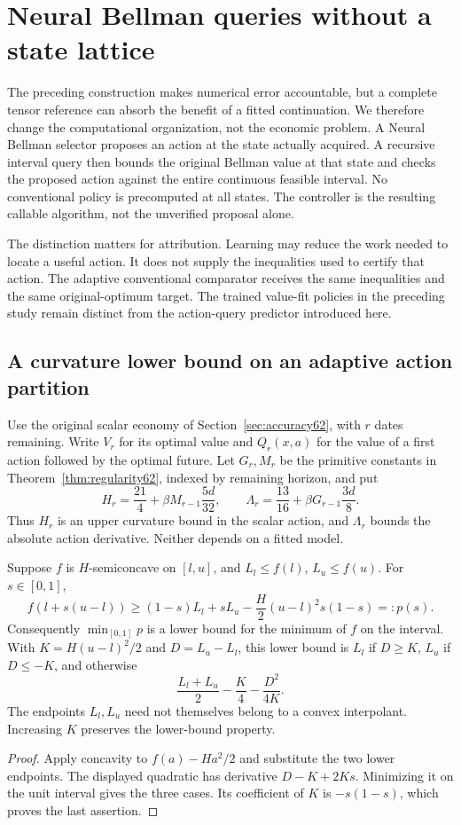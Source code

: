 \section{Neural Bellman queries without a state lattice}\label{sec:query63}
The preceding construction makes numerical error accountable, but a complete tensor reference can absorb the benefit of a fitted continuation. We therefore change the computational organization, not the economic problem. A Neural Bellman selector proposes an action at the state actually acquired. A recursive interval query then bounds the original Bellman value at that state and checks the proposed action against the entire continuous feasible interval. No conventional policy is precomputed at all states. The controller is the resulting callable algorithm, not the unverified proposal alone.

The distinction matters for attribution. Learning may reduce the work needed to locate a useful action. It does not supply the inequalities used to certify that action. The adaptive conventional comparator receives the same inequalities and the same original-optimum target. The trained value-fit policies in the preceding study remain distinct from the action-query predictor introduced here.

\subsection{A curvature lower bound on an adaptive action partition}
Use the original scalar economy of Section~\ref{sec:accuracy62}, with $r$ dates remaining. Write $V_r$ for its optimal value and $Q_r(x,a)$ for the value of a first action followed by the optimal future. Let $G_r,M_r$ be the primitive constants in Theorem~\ref{thm:regularity62}, indexed by remaining horizon, and put
\[
 H_r=\frac{21}{4}+\beta M_{r-1}\frac{5d}{32},
 \qquad \Lambda_r=\frac{13}{16}+\beta G_{r-1}\frac{3d}{8}.
\]
Thus $H_r$ is an upper curvature bound in the scalar action, and $\Lambda_r$ bounds the absolute action derivative. Neither depends on a fitted model.

\begin{lemma}\label{lem:parabolic63}
Suppose $f$ is $H$-semiconcave on $[l,u]$, and $L_l\le f(l)$, $L_u\le f(u)$. For $s\in[0,1]$,
\[
 f(l+s(u-l))\ge (1-s)L_l+sL_u
                 -\frac H2(u-l)^2s(1-s)=:p(s).
\]
Consequently $\min_{[0,1]}p$ is a lower bound for the minimum of $f$ on the interval. With $K=H(u-l)^2/2$ and $D=L_u-L_l$, this lower bound is $L_l$ if $D\ge K$, $L_u$ if $D\le-K$, and otherwise
\[
 \frac{L_l+L_u}{2}-\frac K4-\frac{D^2}{4K}.
\]
The endpoints $L_l,L_u$ need not themselves belong to a convex interpolant. Increasing $K$ preserves the lower-bound property.
\end{lemma}
\begin{proof}
Apply concavity to $f(a)-Ha^2/2$ and substitute the two lower endpoints. The displayed quadratic has derivative $D-K+2Ks$. Minimizing it on the unit interval gives the three cases. Its coefficient of $K$ is $-s(1-s)$, which proves the last assertion.
\end{proof}

